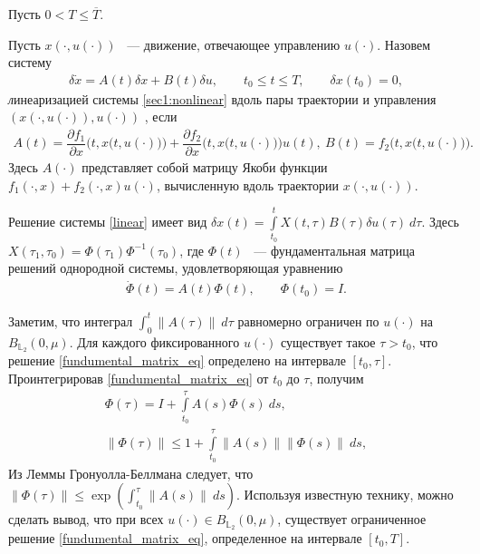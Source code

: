 \documentclass[../main.tex]{subfiles}
\begin{document}
	Пусть $ 0 <  T \leqslant \overline{T} $.
	\begin{definition}\label{def:linearized_system}
		Пусть $ x(\cdot,u(\cdot)) $ ~--- движение, отвечающее управлению $ u(\cdot)$. Назовем систему
		\begin{gather}\label{linear}
			\delta \dot{x} =  A(t) \delta x + B(t) \delta u, \qquad t_0 \leqslant t \leqslant T, \qquad \delta x(t_0) = 0,
		\end{gather}
		{\textit линеаризацией} системы \eqref{sec1:nonlinear} вдоль пары траектории и управления $\left( x(\cdot,u(\cdot)),u(\cdot)\right)   $ , если 
		\begin{gather*}
		    A(t) = \dfrac{\partial f_1}{\partial x} \Big(t,x\big(t,u(\cdot)\big)\Big) + \dfrac{\partial f_2}{\partial x}\Big(t,x\big(t,u(\cdot)\big)\Big) u(t), \  
		    B(t) = f_2 \Big(t,x\big(t,u(\cdot)\big)\Big).
		\end{gather*} Здесь $ A(\cdot) $ представляет собой матрицу Якоби функции $ f_1(\cdot, x) + f_2(\cdot, x) u(\cdot) $, вычисленную вдоль траектории $ x(\cdot,u(\cdot)) $.
	\end{definition}
	Решение системы \eqref{linear} имеет вид $\delta x(t) =  \int\limits_{t_0}^{t} X(t, \tau) B(\tau) \delta u(\tau) \ d\tau $. Здесь $ X(\tau_1,\tau_0)= \Phi(\tau_1) \Phi^{-1}(\tau_0) $, где $\Phi(t) $ ~--- фундаментальная матрица решений однородной системы, удовлетворяющая уравнению 
	\begin{gather}\label{fundumental_matrix_eq}
		\dot{\Phi}(t) = A(t) \Phi(t), \qquad \Phi(t_0) = I.
	\end{gather}
	
	Заметим, что интеграл $\int_0^t \| A(\tau)\|  \ d\tau$ равномерно ограничен по $u(\cdot) $ на $  B_{\mathbb{L}_2}(0,\mu)$. Для каждого фиксированного  $u(\cdot) $ существует такое $\tau > t_0$, что решение \eqref{fundumental_matrix_eq} определено на интервале $ [t_0, \tau] $.  Проинтегрировав \eqref{fundumental_matrix_eq} от $t_0$ до $\tau$, получим
	\begin{gather*}
		\Phi(\tau) = I + \int\limits_{t_0}^{\tau} A(s)  \Phi(s) \ ds, \\
		\|	\Phi(\tau) \| \leqslant 1 +  \int\limits_{t_0}^{\tau} \| A(s)\| \|\Phi(s)\| \ ds,
	\end{gather*}
	Из Леммы Гронуолла-Беллмана \cite{Bellman} следует, что  $	\|	\Phi(\tau) \| \leqslant \exp \left( \int_{t_0}^{\tau}  \| A(s)\| \ ds \right)$. Используя известную технику, можно сделать вывод, что при всех $u(\cdot) \in  B_{\mathbb{L}_2}(0,\mu)$, существует ограниченное решение  \eqref{fundumental_matrix_eq}, определенное на интервале $[t_0, T]$.
	
\end{document}
